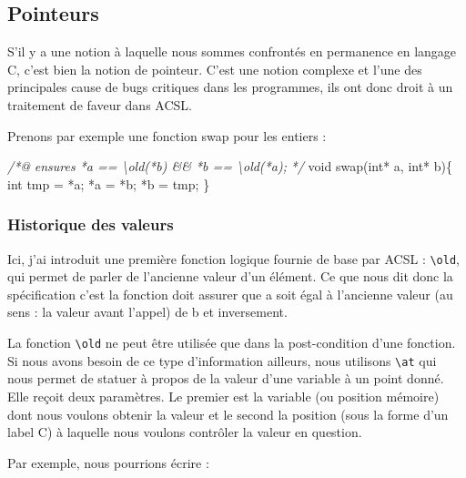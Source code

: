 \documentclass[12pt,francais,]{scrbook}
\newenvironment{Shaded}{}{}
\newcommand{\DataTypeTok}[1]{\textcolor[rgb]{0.56,0.13,0.00}{{#1}}}
\newcommand{\CommentTok}[1]{\textcolor[rgb]{0.38,0.63,0.69}{\textit{{#1}}}}
\newcommand{\NormalTok}[1]{{#1}}
\begin{document}
\subsection{Pointeurs}\label{pointeurs}

S'il y a une notion à laquelle nous sommes confrontés en permanence en
langage C, c'est bien la notion de pointeur. C'est une notion complexe
et l'une des principales cause de bugs critiques dans les programmes,
ils ont donc droit à un traitement de faveur dans ACSL.

Prenons par exemple une fonction swap pour les entiers :

\begin{footnotesize}\begin{Shaded}
\begin{Highlighting}[]
\CommentTok{/*@}
\CommentTok{  ensures *a == \textbackslash{}old(*b) && *b == \textbackslash{}old(*a);}
\CommentTok{*/}
\DataTypeTok{void} \NormalTok{swap(}\DataTypeTok{int}\NormalTok{* a, }\DataTypeTok{int}\NormalTok{* b)\{}
  \DataTypeTok{int} \NormalTok{tmp = *a;}
  \NormalTok{*a = *b;}
  \NormalTok{*b = tmp;}
\NormalTok{\}}
\end{Highlighting}
\end{Shaded}\end{footnotesize}

\subsubsection{Historique des valeurs}\label{historique-des-valeurs}

Ici, j'ai introduit une première fonction logique fournie de base par
ACSL : \texttt{\textbackslash{}old}, qui permet de parler de l'ancienne
valeur d'un élément. Ce que nous dit donc la spécification c'est \og{}la
fonction doit assurer que a soit égal à l'ancienne valeur (au sens : la
valeur avant l'appel) de b et inversement\fg{}.

La fonction \texttt{\textbackslash{}old} ne peut être utilisée que dans
la post-condition d'une fonction. Si nous avons besoin de ce type
d'information ailleurs, nous utilisons \texttt{\textbackslash{}at} qui
nous permet de statuer à propos de la valeur d'une variable à un point
donné. Elle reçoit deux paramètres. Le premier est la variable (ou
position mémoire) dont nous voulons obtenir la valeur et le second la
position (sous la forme d'un label C) à laquelle nous voulons contrôler
la valeur en question.

Par exemple, nous pourrions écrire :
\end{document}
